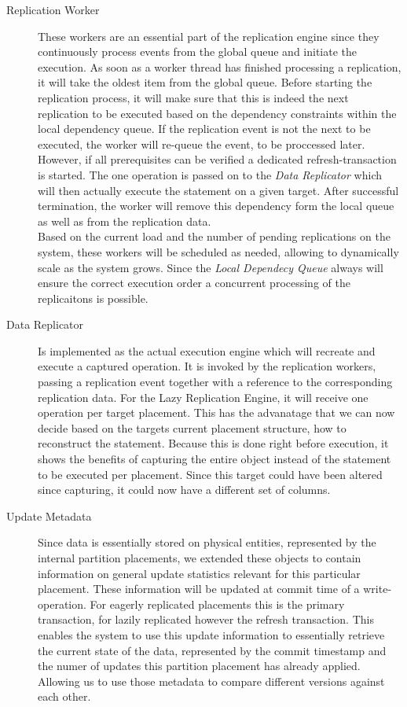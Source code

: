 \begin{description}
    \item[Replication Worker] These workers are an essential part of the replication engine since they continuously process events from the global queue 
    and initiate the execution. As soon as a worker thread has finished processing a replication, it will take the oldest item from the global queue. 
    Before starting the replication process, it will make sure that this is indeed the next replication to be executed based on the dependency constraints
    within the local dependency queue. If the replication event is not the next to be executed, the worker will re-queue the event, to be proccessed later.
    However, if all prerequisites can be verified a dedicated refresh-transaction is started.
    The one operation is passed on to the \emph{Data Replicator} which will then actually execute the statement on a given target.
    After successful termination, the worker will remove this dependency form the local queue as well as from the replication data. \\
    Based on the current load and the number of pending replications on the system, these workers will be scheduled as needed, allowing to dynamically scale as the system grows.
    Since the \emph{Local Dependecy Queue} always will ensure the correct execution order a concurrent processing of the replicaitons is possible.     
    


    \item[Data Replicator] Is implemented as the actual execution engine which will recreate and execute a captured operation. 
    It is invoked by the replication workers, passing a replication event together with a reference to the corresponding replication data.
    For the Lazy Replication Engine, it will receive one operation per target placement. 
    This has the advanatage that we can now decide based on the targets current placement structure, how to reconstruct the statement. 
    Because this is done right before execution, it shows the benefits of capturing the entire object instead of the statement to be executed per placement. 
    Since this target could have been altered since capturing, it could now have a different set of columns.



    \item[Update Metadata] Since data is essentially stored on physical entities, represented by the internal partition placements, we extended these objects 
    to contain information on general update statistics relevant for this particular placement. These information will be updated at commit time of a write-operation.
    For eagerly replicated placements this is the primary transaction, for lazily replicated however the refresh transaction.
    This enables the system to use this update information to essentially retrieve the current state of the data, represented by the commit timestamp
    and the numer of updates this partition placement has already applied. Allowing us to use those metadata to compare different versions against each other.

\end{description}



